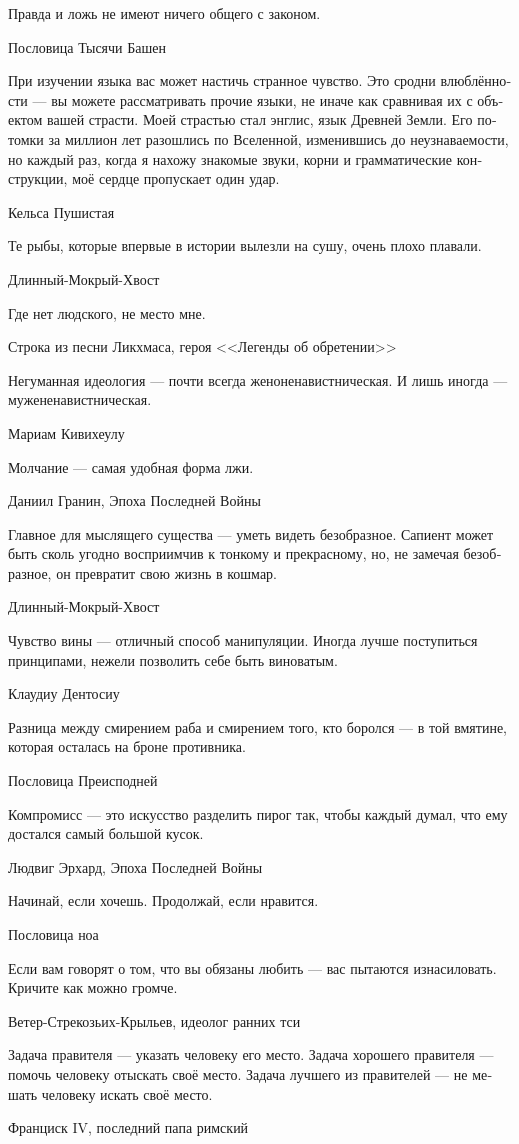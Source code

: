 \documentclass[a4paper,12pt,fleqn]{book}\usepackage{polyglossia}\setdefaultlanguage[babelshorthands=true]{russian}\setotherlanguage{english}\defaultfontfeatures{Ligatures=TeX,Mapping=tex-text}\usepackage{xcolor}\newcommand{\ml}[3]{#2}
\begin{document}
{\epigraph
{Правда и ложь не имеют ничего общего с законом.}
{Пословица Тысячи Башен}

\epigraph
{При изучении языка вас может настичь странное чувство.
Это сродни влюблённости --- вы можете рассматривать прочие языки, не иначе как сравнивая их с объектом вашей страсти.
Моей страстью стал энглис, язык Древней Земли.
Его потомки за миллион лет разошлись по Вселенной, изменившись до неузнаваемости, но каждый раз, когда я нахожу знакомые звуки, корни и грамматические конструкции, моё сердце пропускает один удар.}
{Кельса Пушистая}

\epigraph{Те рыбы, которые впервые в истории вылезли на сушу, очень плохо плавали.}
{Длинный-Мокрый-Хвост}

\epigraph
{Где нет людского, не место мне.}
{Строка из песни Ликхмаса, героя <<Легенды об обретении>>}

\epigraph
{Негуманная идеология --- почти всегда женоненавистническая.
И лишь иногда --- мужененавистническая.}
{Мариам Кивихеулу}

\epigraph
{Молчание --- самая удобная форма лжи.}
{Даниил Гранин, Эпоха Последней Войны}

\epigraph
{Главное для мыслящего существа --- уметь видеть безобразное.
Сапиент может быть сколь угодно восприимчив к тонкому и прекрасному, но, не замечая безобразное, он превратит свою жизнь в кошмар.}
{Длинный-Мокрый-Хвост}

\epigraph
{Чувство вины --- отличный способ манипуляции.
Иногда лучше поступиться принципами, нежели позволить себе быть виноватым.}
{Клаудиу Дентосиу}

\epigraph{
\ml{$0$}
{Разница между смирением раба и смирением того, кто боролся --- в той вмятине, которая осталась на броне противника.}
{Between humility of slave and humility of the one who fought lies a dent in the enemy's armour.}
}{Пословица Преисподней}

\epigraph
{Компромисс --- это искусство разделить пирог так, чтобы каждый думал, что ему достался самый большой кусок.}
{Людвиг Эрхард, Эпоха Последней Войны}

\epigraph{
\ml{$0$}
{Начинай, если хочешь.}
{Begin if you want.}
\ml{$0$}
{Продолжай, если нравится.}
{Continue if you like.}
}{Пословица ноа}

\epigraph
{Если вам говорят о том, что вы обязаны любить --- вас пытаются изнасиловать.
Кричите как можно громче.}
{Ветер-Стрекозьих-Крыльев, идеолог ранних тси}

\epigraph
{Задача правителя --- указать человеку его место.
Задача хорошего правителя --- помочь человеку отыскать своё место.
Задача лучшего из правителей --- не мешать человеку искать своё место.}
{Франциск IV, последний папа римский}

}
\end{document}
